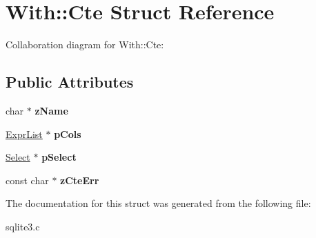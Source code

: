 \hypertarget{structWith_1_1Cte}{}\section{With\+:\+:Cte Struct Reference}
\label{structWith_1_1Cte}


Collaboration diagram for With\+:\+:Cte\+:
\subsection*{Public Attributes}
\begin{DoxyCompactItemize}
\item 
char $\ast$ {\bfseries z\+Name}\hypertarget{structWith_1_1Cte_a3ce66361944f92f0d3fc354025320dd6}{}\label{structWith_1_1Cte_a3ce66361944f92f0d3fc354025320dd6}

\item 
\hyperlink{structExprList}{Expr\+List} $\ast$ {\bfseries p\+Cols}\hypertarget{structWith_1_1Cte_a9e43b7bf43ff5878c465f683fc464456}{}\label{structWith_1_1Cte_a9e43b7bf43ff5878c465f683fc464456}

\item 
\hyperlink{structSelect}{Select} $\ast$ {\bfseries p\+Select}\hypertarget{structWith_1_1Cte_a90fd9f2a4529a6fd1e75cabeccec16cd}{}\label{structWith_1_1Cte_a90fd9f2a4529a6fd1e75cabeccec16cd}

\item 
const char $\ast$ {\bfseries z\+Cte\+Err}\hypertarget{structWith_1_1Cte_a2e0558ed352afe93f08cb8a9ed407223}{}\label{structWith_1_1Cte_a2e0558ed352afe93f08cb8a9ed407223}

\end{DoxyCompactItemize}


The documentation for this struct was generated from the following file\+:\begin{DoxyCompactItemize}
\item 
sqlite3.\+c\end{DoxyCompactItemize}
